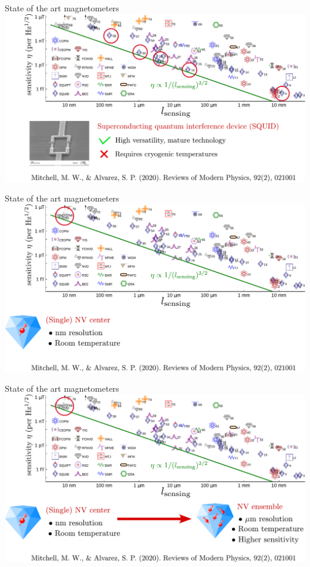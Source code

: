 \documentclass{beamer}
\begin{document}
\begin{frame}{State of the art magnetometers}
\centering
\includegraphics[width=\textwidth,height=0.85\textheight,keepaspectratio]{Slide_quantum_magnetometers_SQUID}
\end{frame}

\begin{frame}{State of the art magnetometers}
\centering
\includegraphics[width=\textwidth,height=0.85\textheight,keepaspectratio]{Slide_quantum_magnetometers_NV_n-3}
\end{frame}

\begin{frame}{State of the art magnetometers}
\centering
\includegraphics[width=\textwidth,height=0.85\textheight,keepaspectratio]{Slide_quantum_magnetometers_NV_n-2}
\end{frame}
\end{document}
